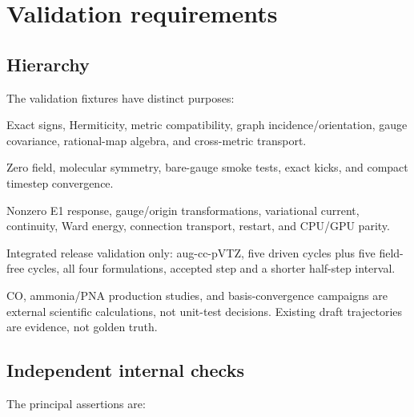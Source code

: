 \documentclass[11pt]{article}
\begin{document}
\section{Validation requirements}

\subsection{Hierarchy}

The validation fixtures have distinct purposes:

\begin{description}[leftmargin=32mm,style=nextline]
\item[Synthetic matrices]
Exact signs, Hermiticity, metric compatibility, graph incidence/orientation,
gauge covariance, rational-map algebra, and cross-metric transport.
\item[H\(_2\)]
Zero field, molecular symmetry, bare-gauge smoke tests, exact kicks, and
compact timestep convergence.
\item[LiH]
Nonzero E1 response, gauge/origin transformations, variational current,
continuity, Ward energy, connection transport, restart, and CPU/GPU parity.
\item[NH\(_3\)]
Integrated release validation only: aug-cc-pVTZ, five driven cycles plus five
field-free cycles, all four formulations, accepted step and a shorter
half-step interval.
\end{description}

CO, ammonia/PNA production studies, and basis-convergence campaigns are
external scientific calculations, not unit-test decisions. Existing draft
trajectories are evidence, not golden truth.

\subsection{Independent internal checks}

The principal assertions are:
\end{document}
